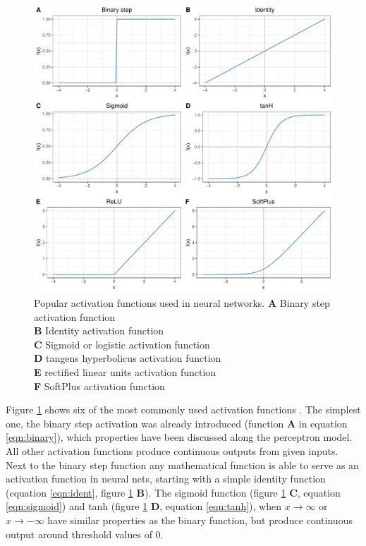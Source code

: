 \begin{figure}[H]
\centering
\includegraphics[height=.55\textheight, width=.85\textwidth]{Figures/activation}
\decoRule
\caption[Popular activation functions for neural networks]{Popular activation functions used in
  neural networks.
  \textbf{A} Binary step activation function \\
  \textbf{B} Identity activation function \\
  \textbf{C} Sigmoid or logistic activation function \\
  \textbf{D} tangens hyperbolicus activation function \\
  \textbf{E} rectified linear units activation function \\
  \textbf{F} SoftPlus activation function\\}
\label{fig:activation}
\end{figure}


Figure \ref{fig:activation} shows six of the most commonly used activation functions
\cite{warner1996understanding}. The simplest one, the binary step activation was already
introduced (function \textbf{A} in equation \ref{eqn:binary}), which properties have been
discussed along the perceptron model. All other activation functions produce continuous outputs from given inputs. \\
Next to the binary step function any mathematical function is able to serve as an activation
function in neural nets, starting with a simple identity function (equation
\ref{eqn:ident}, figure \ref{fig:activation} \textbf{B}). The sigmoid function (figure
\ref{fig:activation} \textbf{C}, equation \ref{eqn:sigmoid}) and tanh (figure
\ref{fig:activation} \textbf{D}, equation \ref{eqn:tanh}), when $x \rightarrow \infty$ or
$x \rightarrow -\infty$ have similar properties as the binary function, but produce
continuous output around threshold values of 0.

